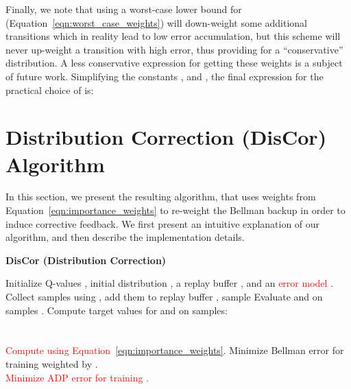 \documentclass[jmlr]{article}
\newcommand{\textdiff}[1]{\textcolor{red}{#1}}
\begin{document}
Finally, we note that using a worst-case lower bound for  (Equation~\ref{eqn:worst_case_weights}) will down-weight some additional transitions which in reality lead to low error accumulation, but this scheme will never up-weight a transition with high error, thus providing for a ``conservative'' distribution. A less conservative expression for getting these weights is a subject of future work.
Simplifying the constants ,  and , the final expression for the practical choice of  is:







 \section{Distribution Correction (DisCor) Algorithm}
\label{sec:method_description}
In this section, we present the resulting algorithm, that uses weights  from Equation~\ref{eqn:importance_weights} to re-weight the Bellman backup in order to induce corrective feedback. We first present an intuitive explanation of our algorithm, and then describe the implementation details. 


\begin{algorithm}[t]
\small
\caption{\textbf{DisCor (Distribution Correction)}}
\label{alg:discor}
\begin{algorithmic}[1]
    \STATE Initialize Q-values , initial distribution , a replay buffer , and an \textdiff{error model} .
        \STATE Collect  samples using , add them to replay buffer , sample 
        \STATE Evaluate  and  on samples .
        \STATE Compute target values for  and  on samples:\\
        \\ \\
        
        \STATE \textdiff{Compute  using Equation~\ref{eqn:importance_weights}}. 
        \STATE Minimize Bellman error for training  weighted by . \\
        
        \STATE \textdiff{Minimize ADP error for training . \\
        }
    \ENDFOR
\end{algorithmic}
\end{algorithm}
\end{document}
